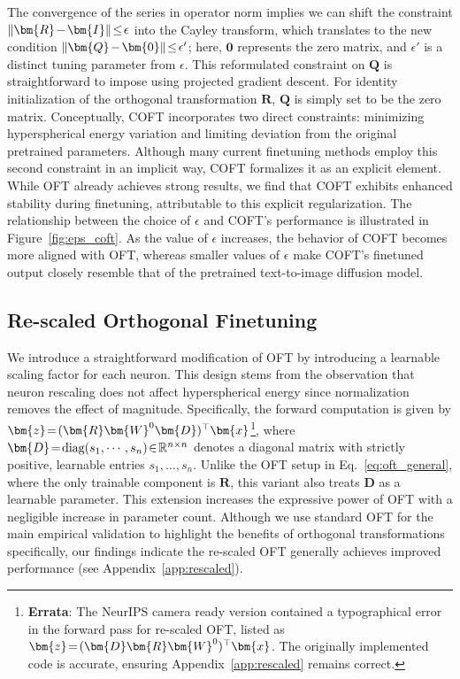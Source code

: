 The convergence of the series in operator norm implies we can shift the constraint $\thickmuskip=2mu \medmuskip=2mu\|\bm{R}-\bm{I}\|\leq\epsilon$ into the Cayley transform, which translates to the new condition $\thickmuskip=2mu \medmuskip=2mu \|\bm{Q}-\bm{0}\|\leq\epsilon'$; here, $\bm{0}$ represents the zero matrix, and $\epsilon'$ is a distinct tuning parameter from $\epsilon$. This reformulated constraint on $\bm{Q}$ is straightforward to impose using projected gradient descent. For identity initialization of the orthogonal transformation $\bm{R}$, $\bm{Q}$ is simply set to be the zero matrix. Conceptually, COFT incorporates two direct constraints: minimizing hyperspherical energy variation and limiting deviation from the original pretrained parameters. Although many current finetuning methods employ this second constraint in an implicit way, COFT formalizes it as an explicit element. While OFT already achieves strong results, we find that COFT exhibits enhanced stability during finetuning, attributable to this explicit regularization. The relationship between the choice of $\epsilon$ and COFT’s performance is illustrated in Figure~\ref{fig:eps_coft}. As the value of $\epsilon$ increases, the behavior of COFT becomes more aligned with OFT, whereas smaller values of $\epsilon$ make COFT’s finetuned output closely resemble that of the pretrained text-to-image diffusion model.

\subsection{Re-scaled Orthogonal Finetuning}

We introduce a straightforward modification of OFT by introducing a learnable scaling factor for each neuron. This design stems from the observation that neuron rescaling does not affect hyperspherical energy since normalization removes the effect of magnitude. Specifically, the forward computation is given by $\thickmuskip=2mu \medmuskip=2mu\bm{z}=(\bm{R}\bm{W}^0\bm{D})^\top\bm{x}$\footnote{\textbf{Errata}: The NeurIPS camera ready version contained a typographical error in the forward pass for re-scaled OFT, listed as $\thickmuskip=2mu \medmuskip=2mu\bm{z}=(\bm{D}\bm{R}\bm{W}^0)^\top\bm{x}$. The originally implemented code is accurate, ensuring Appendix~\ref{app:rescaled} remains correct.}, where $\thickmuskip=2mu \medmuskip=2mu\bm{D}=\text{diag}(s_1,\cdots,s_n)\in\mathbb{R}^{n\times n}$ denotes a diagonal matrix with strictly positive, learnable entries $s_1,\ldots,s_n$. Unlike the OFT setup in Eq.~\eqref{eq:oft_general}, where the only trainable component is $\bm{R}$, this variant also treats $\bm{D}$ as a learnable parameter. This extension increases the expressive power of OFT with a negligible increase in parameter count. Although we use standard OFT for the main empirical validation to highlight the benefits of orthogonal transformations specifically, our findings indicate the re-scaled OFT generally achieves improved performance (see Appendix~\ref{app:rescaled}).


